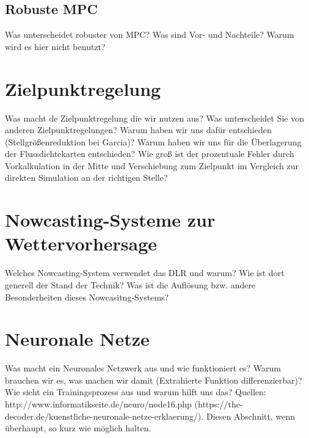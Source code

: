 \subsection{Robuste MPC} \label{subsec_RobusteMPC}
Was unterscheidet robuster von  MPC? Was sind Vor- und Nachteile?
Warum wird es hier nicht benutzt?

\section{Zielpunktregelung} \label{sec_Zielpunktregelung}
Was macht de Zielpunktregelung die wir nutzen aus?
Was unterscheidet Sie von anderen Zielpunktregelungen?
Warum haben wir uns dafür entschieden (Stellgrößenreduktion bei Garcia)?
Warum haben wir uns für die Überlagerung der Flussdichtekarten entschieden?
Wie groß ist der prozentuale Fehler durch Vorkalkulation in der Mitte und Verschiebung zum Zielpunkt im Vergleich zur direkten Simulation an der richtigen Stelle?

\section{Nowcasting-Systeme zur Wettervorhersage} \label{sec_Nowcasting}
Welches Nowcasting-System verwendet das DLR und warum?
Wie ist dort generell der Stand der Technik?
Was ist die Auflösung bzw. andere Besonderheiten dieses Nowcasitng-Systems?

\section{Neuronale Netze} \label{sec_NN}
Was macht ein Neuronales Netzwerk aus und wie funktioniert es?
Warum brauchen wir es, was machen wir damit (Extrahierte Funktion differenzierbar)?
Wie sieht ein Trainingsprozess aus und warum hilft uns das?
Quellen: http://www.informatikseite.de/neuro/node16.php (https://the-decoder.de/kuenstliche-neuronale-netze-erklaerung/).
Diesen Abschnitt, wenn überhaupt, so kurz wie möglich halten.

